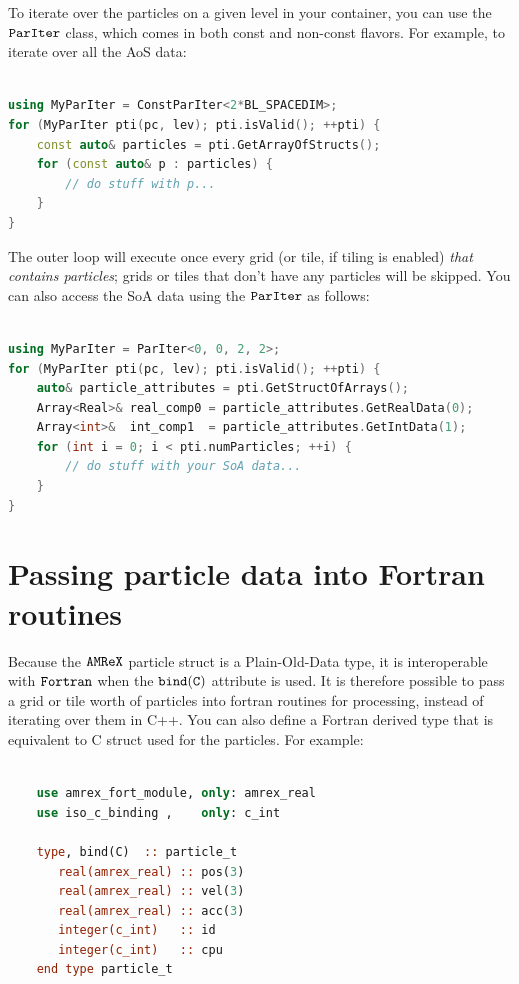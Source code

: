 To iterate over the particles on a given level in your container, you can use the $\tt{ParIter}$ class, which comes in 
both const and non-const flavors. For example, to iterate over all the AoS data:

\begin{lstlisting}[language=cpp]

using MyParIter = ConstParIter<2*BL_SPACEDIM>;
for (MyParIter pti(pc, lev); pti.isValid(); ++pti) {
    const auto& particles = pti.GetArrayOfStructs();
    for (const auto& p : particles) {
        // do stuff with p...
    }
}
\end{lstlisting}

The outer loop will execute once every grid (or tile, if tiling is enabled) \emph{that contains particles}; grids or tiles
that don't have any particles will be skipped. You can also access the SoA data using the $\tt{ParIter}$ as follows:

\begin{lstlisting}[language=cpp]

using MyParIter = ParIter<0, 0, 2, 2>;
for (MyParIter pti(pc, lev); pti.isValid(); ++pti) {
    auto& particle_attributes = pti.GetStructOfArrays();
    Array<Real>& real_comp0 = particle_attributes.GetRealData(0);
    Array<int>&  int_comp1  = particle_attributes.GetIntData(1);
    for (int i = 0; i < pti.numParticles; ++i) {
        // do stuff with your SoA data...
    }
}
\end{lstlisting}

\section{Passing particle data into Fortran routines}
\label{sec:Particles:Fortran}

Because the $\tt{AMReX}$ particle struct is a Plain-Old-Data type, it is interoperable with $\tt{Fortran}$ when the $\tt{bind(C)}$
attribute is used. It is therefore possible to pass a grid or tile worth of particles into fortran routines for processing,
instead of iterating over them in C++. You can also define a Fortran derived type that is equivalent to C struct used for the
particles. For example:

\begin{lstlisting}[language=fortran]

    use amrex_fort_module, only: amrex_real
    use iso_c_binding ,    only: c_int

    type, bind(C)  :: particle_t
       real(amrex_real) :: pos(3)
       real(amrex_real) :: vel(3)
       real(amrex_real) :: acc(3)
       integer(c_int)   :: id
       integer(c_int)   :: cpu
    end type particle_t

\end{lstlisting}


